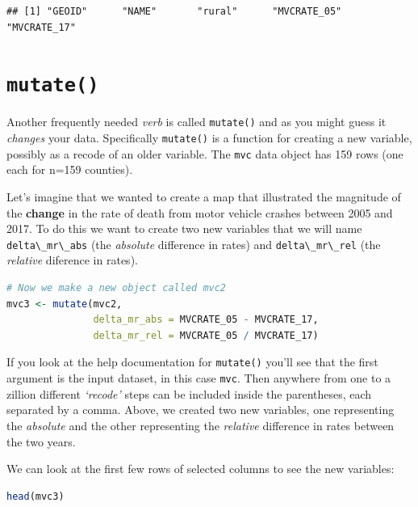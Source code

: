\documentclass[
]{book}
\newcommand{\passthrough}[1]{#1}
\begin{document}
\begin{lstlisting}
## [1] "GEOID"      "NAME"       "rural"      "MVCRATE_05" "MVCRATE_17"
\end{lstlisting}

\hypertarget{mutate}{%
\section{\texorpdfstring{\texttt{mutate()}}{mutate()}}\label{mutate}}

Another frequently needed \emph{verb} is called \passthrough{\lstinline!mutate()!} and as you might guess it \emph{changes} your data. Specifically \passthrough{\lstinline!mutate()!} is a function for creating a new variable, possibly as a recode of an older variable. The \passthrough{\lstinline!mvc!} data object has 159 rows (one each for n=159 counties).

Let's imagine that we wanted to create a map that illustrated the magnitude of the \textbf{change} in the rate of death from motor vehicle crashes between 2005 and 2017. To do this we want to create two new variables that we will name \passthrough{\lstinline!delta\_mr\_abs!} (the \emph{absolute} difference in rates) and \passthrough{\lstinline!delta\_mr\_rel!} (the \emph{relative} diference in rates).

\begin{lstlisting}[language=R]
# Now we make a new object called mvc2
mvc3 <- mutate(mvc2, 
               delta_mr_abs = MVCRATE_05 - MVCRATE_17,
               delta_mr_rel = MVCRATE_05 / MVCRATE_17)
\end{lstlisting}

If you look at the help documentation for \passthrough{\lstinline!mutate()!} you'll see that the first argument is the input dataset, in this case \passthrough{\lstinline!mvc!}. Then anywhere from one to a zillion different \emph{`recode'} steps can be included inside the parentheses, each separated by a comma. Above, we created two new variables, one representing the \emph{absolute} and the other representing the \emph{relative} difference in rates between the two years.

We can look at the first few rows of selected columns to see the new variables:

\begin{lstlisting}[language=R]
head(mvc3)
\end{lstlisting}

 
  \providecommand{\huxb}[2]{\arrayrulecolor[RGB]{#1}\global\arrayrulewidth=#2pt}
  \providecommand{\huxvb}[2]{\color[RGB]{#1}\vrule width #2pt}
  \providecommand{\huxtpad}[1]{\rule{0pt}{#1}}
  \providecommand{\huxbpad}[1]{\rule[-#1]{0pt}{#1}}
\end{document}
